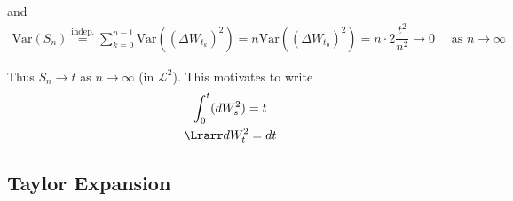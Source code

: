 \noindent and
\begin{equation*}
  \begin{gathered}
    \text{Var}\left(S_n\right) \stackrel{\text{indep.}}{=} \sum_{k=0}^{n-1}\text{Var}\left(\left(\Delta W_{t_k}\right)^2\right) = n\text{Var}\left(\left(\Delta W_{t_0}\right)^2\right) = n\cdot2\dfrac{t^2}{n^2}\to0\quad\text{ as } n\to\infty
  \end{gathered}
\end{equation*}\par
\noindent Thus $S_n\to t$ as $n\to\infty$ (in $\mathcal{L}^2$). This motivates to write
\begin{equation*}
  \begin{gathered}
    \int_{0}^{t}(dW_s^2) = t\\
    \Lrarr dW_t^2 = dt
  \end{gathered}
\end{equation*}
\par\bigskip
\subsection{Taylor Expansion}\hfill\\

